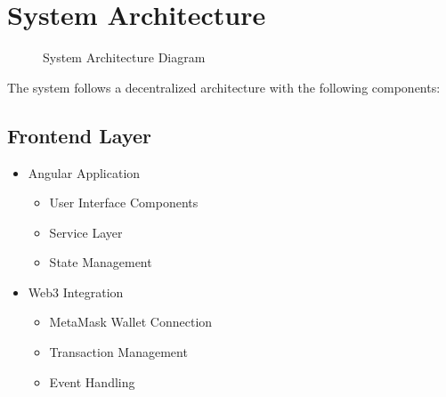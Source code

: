 \documentclass[12pt,a4paper]{article}
\begin{document}
    \section{System Architecture}
    \begin{figure}
        \centering
        \caption{System Architecture Diagram}
        \label{fig:architecture}
    \end{figure}

    The system follows a decentralized architecture with the following components:

    \subsection{Frontend Layer}
    \begin{itemize}
        \item Angular Application
        \begin{itemize}
            \item User Interface Components
            \item Service Layer
            \item State Management
        \end{itemize}

        \item Web3 Integration
        \begin{itemize}
            \item MetaMask Wallet Connection
            \item Transaction Management
            \item Event Handling
        \end{itemize}
    \end{itemize}
\end{document}
